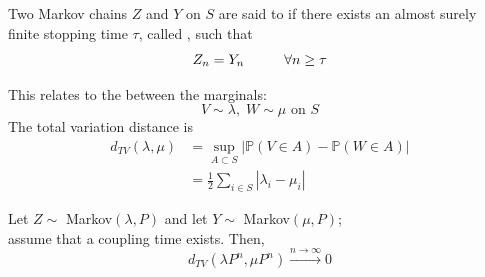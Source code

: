 \documentclass{article}
\begin{document}
\begin{definition}
    Two Markov chains $Z$ and $Y$ on $S$ are said to  if there exists an almost surely finite stopping time $\tau$, called , such that 
        \begin{equation*}
            Z_n = Y_n \hspace{1 cm} \forall n \geq \tau
        \end{equation*}
\end{definition}
This relates to the  between the marginals:
\begin{equation*}
    V \sim \lambda,\; W \sim \mu \text{ on } S
\end{equation*}
The total variation distance is 
\begin{align*}
    d_{TV}(\lambda,\mu) &= \sup_{A \subset S} |\mathbb{P}(V \in A) - \mathbb{P}(W \in A)| \\
    &= \frac{1}{2} \sum_{i \in S} |\lambda_i - \mu_i|
\end{align*}
\begin{proposition}
    \label{totvardist}
        Let $Z \sim$ Markov$(\lambda, P)$ and 
        let $Y \sim$ Markov$(\mu, P)$; \\
        assume that a coupling time exists. Then,
        \begin{equation*}
            d_{TV}(\lambda P^n, \mu P^n) \xrightarrow{n \rightarrow \infty} 0
        \end{equation*}
\end{proposition}
\end{document}
